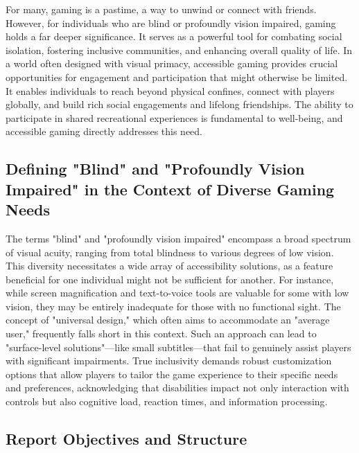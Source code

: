 For many, gaming is a pastime, a way to unwind or connect with friends. However, for individuals who are blind or profoundly vision impaired, gaming holds a far deeper significance. It serves as a powerful tool for combating social isolation, fostering inclusive communities, and enhancing overall quality of life\supercite{AbleGamers2025}. In a world often designed with visual primacy, accessible gaming provides crucial opportunities for engagement and participation that might otherwise be limited. It enables individuals to reach beyond physical confines, connect with players globally, and build rich social engagements and lifelong friendships\supercite{AbleGamers2025}. The ability to participate in shared recreational experiences is fundamental to well-being, and accessible gaming directly addresses this need.

\subsection{Defining "Blind" and "Profoundly Vision Impaired" in the Context of Diverse Gaming Needs}

The terms "blind" and "profoundly vision impaired" encompass a broad spectrum of visual acuity, ranging from total blindness to various degrees of low vision. This diversity necessitates a wide array of accessibility solutions, as a feature beneficial for one individual might not be sufficient for another. For instance, while screen magnification and text-to-voice tools are valuable for some with low vision, they may be entirely inadequate for those with no functional sight\supercite{LighthouseGuild2025}. The concept of "universal design," which often aims to accommodate an "average user," frequently falls short in this context. Such an approach can lead to "surface-level solutions"—like small subtitles—that fail to genuinely assist players with significant impairments\supercite{Wayline2025}. True inclusivity demands robust customization options that allow players to tailor the game experience to their specific needs and preferences, acknowledging that disabilities impact not only interaction with controls but also cognitive load, reaction times, and information processing\supercite{Wayline2025}.

\subsection{Report Objectives and Structure}

